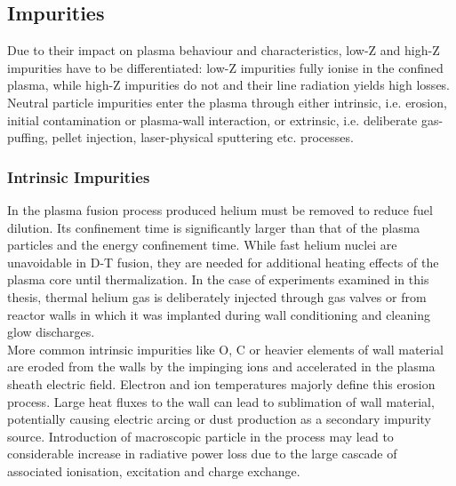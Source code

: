         \subsection{Impurities}\label{subsec:impurities}%
%
            Due to their impact on plasma behaviour and characteristics, low-Z and high-Z impurities have to be differentiated: low-Z impurities fully ionise in the confined plasma, while high-Z impurities do not and their line radiation yields high losses. Neutral particle impurities enter the plasma through either intrinsic, i.e. erosion, initial contamination or plasma-wall interaction, or extrinsic, i.e. deliberate gas-puffing, pellet injection, laser-physical sputtering etc. processes.%
%
            \subsubsection*{Intrinsic Impurities}%
%
                In the plasma fusion process produced helium must be removed to reduce fuel dilution. Its confinement time is significantly larger than that of the plasma particles and the energy confinement time. While fast helium nuclei are unavoidable in D-T fusion, they are needed for additional heating effects of the plasma core until thermalization. In the case of experiments examined in this thesis, thermal helium gas is deliberately injected through gas valves or from reactor walls in which it was implanted during wall conditioning and cleaning glow discharges\cite{Hogan2000,Mavrin2020,Bosch2000}.\\%
                More common intrinsic impurities like O, C or heavier elements of wall material are eroded from the walls by the impinging ions and accelerated in the plasma sheath electric field. Electron and ion temperatures majorly define this erosion process. Large heat fluxes to the wall can lead to sublimation of wall material, potentially causing electric arcing or dust production as a secondary impurity source. Introduction of macroscopic particle in the process may lead to considerable increase in radiative power loss due to the large cascade of associated ionisation, excitation and charge exchange\cite{Balden2014,Rohde2009,Sereda2020}.%
%
